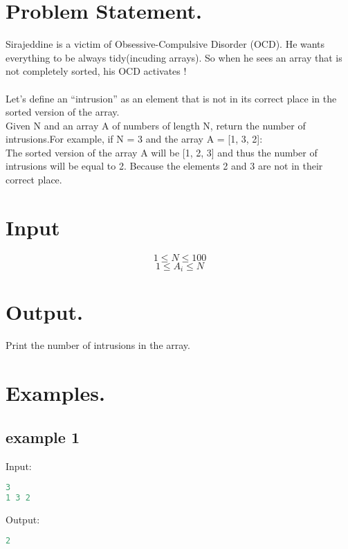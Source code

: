 \documentclass[10pt]{article}
\begin{document}
\section{Problem Statement.}
Sirajeddine is a victim of Obsessive-Compulsive Disorder (OCD). He wants everything to be always tidy(incuding arrays). So when he sees an array that is not completely sorted, his OCD activates !\\
\\
Let’s define an “intrusion” as an element that is not in its correct place in the sorted version of the array.\\
Given N and an array A of numbers of length N, return the number of intrusions.For example, if N = 3 and the array A = [1, 3, 2]:\\
The sorted version of the array A will be [1, 2, 3] and thus the number of intrusions will be equal to 2. Because the elements 2 and 3 are not in their correct place.
\paragraph{}
\section{Input}
$$ 1\le N \le 100 $$
$$ 1\le A_i \le N $$
\section{Output.}
Print the number of intrusions in the array.
\section{Examples.}
\subsection{example 1}
Input:
\begin{lstlisting}[language=Python]
3
1 3 2
\end{lstlisting}
Output:
\begin{lstlisting}[language=Python]
2
\end{lstlisting}
\end{document}
